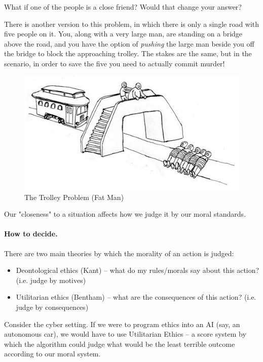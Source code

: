 What if one of the people is a close friend? Would that change your answer?


There is another version to this problem, in which there is only a single road with five people on it. You, along with a very large man, are standing on a bridge above the road, and you have the option of \textit{pushing} the large man beside you off the bridge to block the approaching trolley. The stakes are the same, but in the scenario, in order to save the five you need to actually commit murder!

\begin{figure}[!ht]
    \centering
    \includegraphics[width=\textwidth]{images/The_Trolley_Problem_Fat_Man.jpg}
    \caption{The Trolley Problem (Fat Man)}
    \label{fig:trolley_problem_fat_man}
\end{figure}


Our "closeness" to a situation affects how we judge it by our moral standards.


\paragraph{How to decide.} There are two main theories by which the morality of an action is judged:
\begin{itemize}
    \item Deontological ethics (Kant) -- what do my rules/morals say about this action? (i.e. judge by motives)
    \item Utilitarian ethics (Bentham) -- what are the consequences of this action? (i.e. judge by consequences)
\end{itemize}


Consider the cyber setting. If we were to program ethics into an AI (say, an autonomous car), we would have to use Utilitarian Ethics -- a score system by which the algorithm could judge what would be the least terrible outcome according to our moral system.


